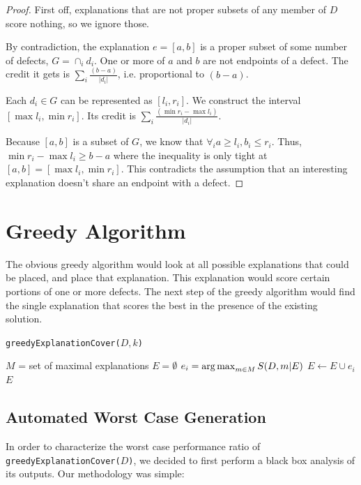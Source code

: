 \documentclass[11pt,twocolumn]{article}
\begin{document}
\begin{proof}
First off, explanations that are not proper subsets of any member of $D$ score nothing, so we ignore those.

By contradiction, the explanation $e = [a,b]$ is a proper subset of some number of defects, $G = \cap_i d_i$.  One or more of $a$ and $b$ are not endpoints of a defect.  The credit it gets is $\sum_i \frac{ (b-a) }{|d_i|} $, i.e. proportional to $(b-a)$.

Each $d_i \in G$ can be represented as $[l_i,r_i]$.  We construct the interval $[\max{l_i}, \min{r_i}]$.  Its credit is $\sum_i \frac{ (\min{r_i} - \max{l_i} ) }{|d_i|} $.  

Because $[a,b]$ is a subset of $G$, we know that $\forall_i a \geq l_i, b_i \leq r_i$.  Thus, $\min{r_i} - \max{l_i} \geq b-a$ where the inequality is only tight at $[a,b] = [\max{l_i}, \min{r_i}]$.  This contradicts the assumption that an interesting explanation doesn't share an endpoint with a defect.
\end{proof}

\section{Greedy Algorithm} \label{sec:greedy}

The obvious greedy algorithm would look at all possible explanations that could be placed, and place that explanation. This explanation would score certain portions of one or more defects.  The next step of the greedy algorithm would find the single explanation that scores the best in the presence of the existing solution.  

\begin{algorithm}
  \caption{ \texttt{greedyExplanationCover($D,k$)} }
  \label{alg:greedy}
  \begin{algorithmic}
    \State $M$ = set of maximal explanations
    \State $E = \emptyset$
    \State $e_i = \operatorname*{arg\,max}_{m\in M} S(D,m|E)$
    \State $E \leftarrow E \cup e_i$
    \EndWhile
    \State \Return $E$
  \end{algorithmic}
\end{algorithm}

\subsection{Automated Worst Case Generation}

In order to characterize the worst case performance ratio of \texttt{greedyExplanationCover($D$)}, we decided to first perform a black box analysis of its outputs.  Our methodology was simple: 
\end{document}
